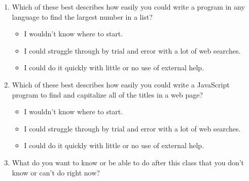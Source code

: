 \begin{enumerate}
\begin{itemize}
  \end{itemize}

\item
  Which of these best describes how easily you could write a program
  in any language
  to find the largest number in a list?

  \begin{itemize}
    
  \item
    I wouldn't know where to start.
    
  \item
    I could struggle through by trial and error with a lot of web
    searches.
    
  \item
    I could do it quickly with little or no use of external help.\\
    
  \end{itemize}

\item
  Which of these best describes
  how easily you could write a JavaScript program
  to find and capitalize all of the titles in a web page?

  \begin{itemize}
    
  \item
    I wouldn't know where to start.
    
  \item
    I could struggle through by trial and error with a lot of web
    searches.
    
  \item
    I could do it quickly with little or no use of external help.\\
    
  \end{itemize}

\item
  What do you want to know or be able to do after this class
  that you don't know or can't do right now?

\end{enumerate}
